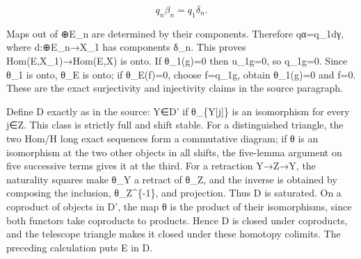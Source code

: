 \documentclass[11pt]{article}
\begin{document}
\[
 q_n\beta_n=q_1\delta_n.
\]

Maps out of \allowbreak{}⊕E\_\allowbreak{}n are determined by their components. Therefore qα\allowbreak{}=q\_\allowbreak{}1dγ,\allowbreak{} where d:\allowbreak{}\allowbreak{}⊕E\_\allowbreak{}n\allowbreak{}→X\_\allowbreak{}1 has components δ\_\allowbreak{}n. This proves Hom(E,\allowbreak{}X\_\allowbreak{}1)\allowbreak{}\allowbreak{}→Hom(E,\allowbreak{}X)\allowbreak{} is onto. If θ\_\allowbreak{}1(g)\allowbreak{}\allowbreak{}=0 then u\_\allowbreak{}1g\allowbreak{}=0,\allowbreak{} so q\_\allowbreak{}1g\allowbreak{}=0. Since θ\_\allowbreak{}1 is onto,\allowbreak{} θ\_\allowbreak{}E is onto; if θ\_\allowbreak{}E(f)\allowbreak{}\allowbreak{}=0,\allowbreak{} choose f\allowbreak{}=q\_\allowbreak{}1g,\allowbreak{} obtain θ\_\allowbreak{}1(g)\allowbreak{}\allowbreak{}=0 and f\allowbreak{}=0. These are the exact surjectivity and injectivity claims in the source paragraph.

Define D\textquotesingle{} exactly as in the source:\allowbreak{} Y\allowbreak{}∈D' if θ\_\allowbreak{}\{Y[j]\allowbreak{}\} is an isomorphism for every j\allowbreak{}∈Z. This class is strictly full and shift stable. For a distinguished triangle,\allowbreak{} the two Hom/\allowbreak{}H long exact sequences form a commutative diagram; if θ is an isomorphism at the two other objects in all shifts,\allowbreak{} the five-lemma argument on five successive terms gives it at the third. For a retraction Y\allowbreak{}→Z\allowbreak{}→Y,\allowbreak{} the naturality squares make θ\_\allowbreak{}Y a retract of θ\_\allowbreak{}Z,\allowbreak{} and the inverse is obtained by composing the inclusion,\allowbreak{} θ\_\allowbreak{}Z\textasciicircum{}\{-1\},\allowbreak{} and projection. Thus D\textquotesingle{} is saturated. On a coproduct of objects in D',\allowbreak{} the map θ is the product of their isomorphisms,\allowbreak{} since both functors take coproducts to products. Hence D\textquotesingle{} is closed under coproducts,\allowbreak{} and the telescope triangle makes it closed under these homotopy colimits. The preceding calculation puts E in D\textquotesingle.
\end{document}
